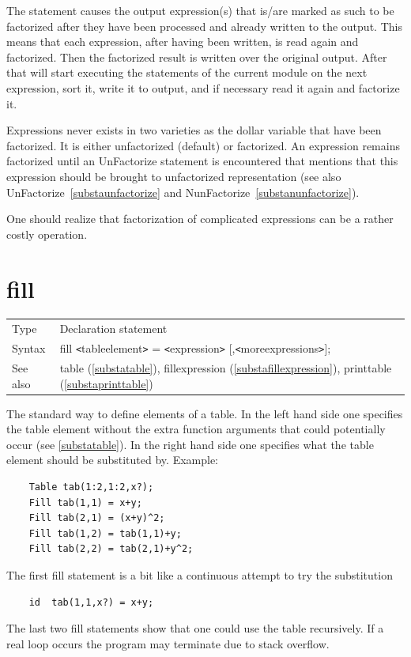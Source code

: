 \noindent The statement causes the output expression(s) that is/are marked 
as such to be factorized after they have been processed and already written 
to the output. This means that each expression, after having been written, 
is read again and factorized. Then the factorized result is written over 
the original output. After that \FORM{} will start executing the statements of 
the current module on the next expression, sort it, write it to output, and 
if necessary read it again and factorize it.

\noindent Expressions never exists in two varieties as the dollar variable 
that have been factorized. It is either unfactorized (default) or 
factorized. An expression remains factorized until an UnFactorize 
statement is encountered that mentions that this expression should be 
brought to unfactorized representation (see also 
UnFactorize~\ref{substaunfactorize} and 
NunFactorize~\ref{substanunfactorize}).

\noindent One should realize that factorization of complicated expressions 
can be a rather costly operation.

\vspace{10mm}


\section{fill}
\label{substafill}

\noindent \begin{tabular}{ll}
Type & Declaration statement\\
Syntax & fill {\tt<}tableelement{\tt>} = {\tt<}expression{\tt>} [,{\tt<}moreexpressions{\tt>}];
\\ See also & table (\ref{substatable}), 
                fillexpression (\ref{substafillexpression}),
                printtable (\ref{substaprinttable})
\end{tabular} \vspace{4mm}

\noindent The standard way to define elements of a 
table. In the left hand 
side one specifies the table element without the extra function arguments 
that could potentially occur (see \ref{substatable}). In the right hand 
side one specifies what the table element should be substituted by. 
Example:
\begin{verbatim}
    Table tab(1:2,1:2,x?);
    Fill tab(1,1) = x+y;
    Fill tab(2,1) = (x+y)^2;
    Fill tab(1,2) = tab(1,1)+y;
    Fill tab(2,2) = tab(2,1)+y^2;
\end{verbatim}
The first fill statement is a bit like a continuous attempt to try the 
substitution
\begin{verbatim}
    id  tab(1,1,x?) = x+y;
\end{verbatim}
The last two fill statements show that one could use the table 
recursively. 
If a real loop occurs the program may terminate due to
stack overflow.

